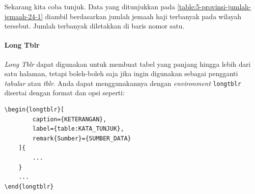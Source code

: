 \begin{enumerate}[label=\arabic*)]
    Sekarang kita coba tunjuk. Data yang ditunjukkan pada \autoref{table:5-provinsi-jumlah-jemaah-24-1} diambil berdasarkan jumlah jemaah haji terbanyak pada wilayah tersebut. Jumlah terbanyak diletakkan di baris nomor satu.
\end{enumerate}

\paragraph{Long Tblr}

\textit{Long Tblr} dapat digunakan untuk membuat tabel yang panjang hingga lebih dari satu halaman, tetapi boleh-boleh saja jika ingin digunakan sebagai pengganti \textit{tabular} atau \textit{tblr}. Anda dapat menggunakannya dengan \textit{environment} \texttt{longtblr} disertai dengan format dan opsi seperti:
\begin{lstlisting}
\begin{longtblr}[
        caption={KETERANGAN},
        label={table:KATA_TUNJUK},
        remark{Sumber}={SUMBER_DATA}
    ]{
        ...
    }
    ...
\end{longtblr}
\end{lstlisting}

